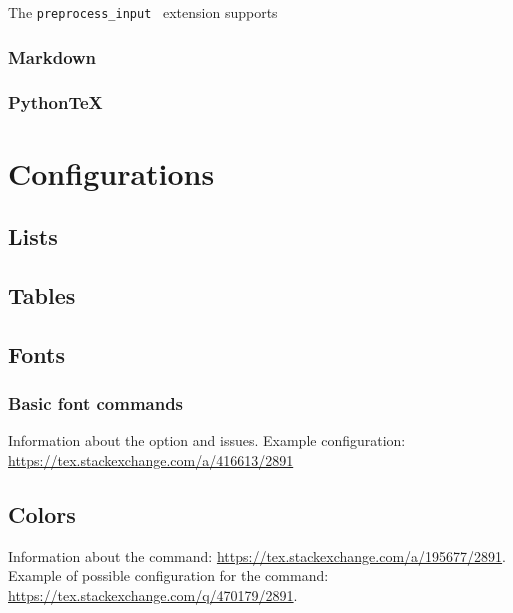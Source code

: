 \documentclass{book}
\begin{document}
The \verb|preprocess_input| \makefourht\ extension supports  

\subsection{Markdown}
\subsection{PythonTeX}






\chapter{Configurations}











\section{Lists}
\section{Tables}

\section{Fonts}
\subsection{Basic font commands}

Information about the  option and  issues. 
Example configuration:
\url{https://tex.stackexchange.com/a/416613/2891}




\section{Colors}

Information about the \texcommand{\color} command:
\url{https://tex.stackexchange.com/a/195677/2891}.
Example of possible configuration for the \texcommand{\color} command: 
\url{https://tex.stackexchange.com/q/470179/2891}.
\end{document}
